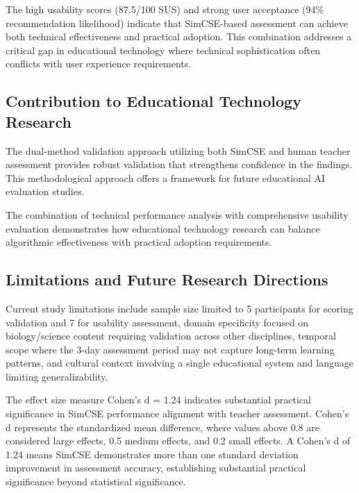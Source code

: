 {{The high usability scores (87.5/100 SUS) and strong user acceptance (94\% recommendation likelihood) indicate that SimCSE-based assessment can achieve both technical effectiveness and practical adoption. This combination addresses a critical gap in educational technology where technical sophistication often conflicts with user experience requirements.

\subsection{Contribution to Educational Technology Research}





{\color{maroon}
The dual-method validation approach utilizing both SimCSE and human teacher assessment provides robust validation that strengthens confidence in the findings. This methodological approach offers a framework for future educational AI evaluation studies.
}



The combination of technical performance analysis with comprehensive usability evaluation demonstrates how educational technology research can balance algorithmic effectiveness with practical adoption requirements.

\subsection{Limitations and Future Research Directions}



{\color{maroon}
Current study limitations include sample size limited to 5 participants for scoring validation and 7 for usability assessment, domain specificity focused on biology/science content requiring validation across other disciplines, temporal scope where the 3-day assessment period may not capture long-term learning patterns, and cultural context involving a single educational system and language limiting generalizability.
}

{\color{maroon}
{\color{maroon}
The effect size measure Cohen's d = 1.24 indicates substantial practical significance in SimCSE performance alignment with teacher assessment. Cohen's d represents the standardized mean difference, where values above 0.8 are considered large effects, 0.5 medium effects, and 0.2 small effects. A Cohen's d of 1.24 means SimCSE demonstrates more than one standard deviation improvement in assessment accuracy, establishing substantial practical significance beyond statistical significance.
}
}

}}
